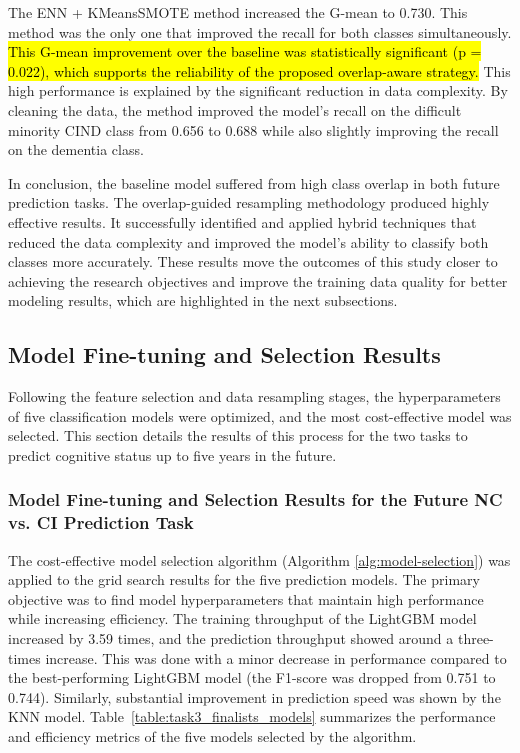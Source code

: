 The ENN + KMeansSMOTE method increased the G-mean to 0.730. This method was the only one that improved the recall for both classes simultaneously. \hl{This G-mean improvement over the baseline was statistically significant (p = 0.022), which supports the reliability of the proposed overlap-aware strategy.} This high performance is explained by the significant reduction in data complexity. By cleaning the data, the method improved the model's recall on the difficult minority CIND class from 0.656 to 0.688 while also slightly improving the recall on the dementia class.

In conclusion, the baseline model suffered from high class overlap in both future prediction tasks. The overlap-guided resampling methodology produced highly effective results. It successfully identified and applied hybrid techniques that reduced the data complexity and improved the model's ability to classify both classes more accurately. These results move the outcomes of this study closer to achieving the research objectives and improve the training data quality for better modeling results, which are highlighted in the next subsections.

\subsection{Model Fine-tuning and Selection Results}
Following the feature selection and data resampling stages, the hyperparameters of five classification models were optimized, and the most cost-effective model was selected. This section details the results of this process for the two tasks to predict cognitive status up to five years in the future.

\subsubsection{Model Fine-tuning and Selection Results for the Future NC vs. CI Prediction Task}
The cost-effective model selection algorithm (Algorithm \ref{alg:model-selection}) was applied to the grid search results for the five prediction models. The primary objective was to find model hyperparameters that maintain high performance while increasing efficiency. The training throughput of the LightGBM model increased by 3.59 times, and the prediction throughput showed around a three-times increase. This was done with a minor decrease in performance compared to the best-performing LightGBM model (the F1-score was dropped from 0.751 to 0.744). Similarly, substantial improvement in prediction speed was shown by the KNN model. Table~\ref{table:task3_finalists_models} summarizes the performance and efficiency metrics of the five models selected by the algorithm.

